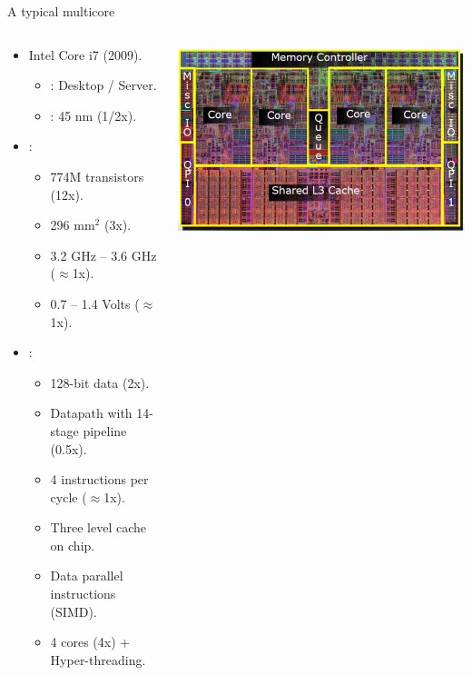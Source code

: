 \begin{frame}[t]{A typical multicore}
\vspace{-1em}
\begin{columns}
  \begin{column}{.7\textwidth}
    \begin{itemize}
      \item Intel Core i7 (2009).
        \begin{itemize}
          \item {}: Desktop / Server.
          \item {}: 45 nm (1/2x).
        \end{itemize}
      \item {}:
        \begin{itemize}
          \item 774M transistors (12x).
          \item 296 mm$^2$ (3x).
          \item 3.2 GHz -- 3.6 GHz ($\approx$1x).
          \item 0.7 -- 1.4 Volts ($\approx$1x).
        \end{itemize}
      \item {}:
        \begin{itemize}
          \item 128-bit data (2x).
          \item Datapath with 14-stage pipeline (0.5x).
          \item 4 instructions per cycle ($\approx$1x).
          \item Three level cache on chip.
          \item Data parallel instructions (SIMD).
          \item 4 cores (4x) + Hyper-threading.
        \end{itemize} 
    \end{itemize}
  \end{column}
  \begin{column}{.35\textwidth}
    \includegraphics[width=\textwidth]{images/intel-core-i7-die.jpg}\\

\end{column}
\end{columns}
\end{frame}
